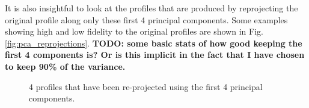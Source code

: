 \documentclass{article}
\newcommand\todo[1]{\textbf{TODO: #1}}
\begin{document}
It is also insightful to look at the profiles that are produced by reprojecting the original profile along only these first 4 principal components. Some examples showing high and low fidelity to the original profiles are shown in Fig. \ref{fig:pca_reprojections}. \todo{some basic stats of how good keeping the first 4 components is? Or is this implicit in the fact that I have chosen to keep 90\% of the variance.}

\begin{figure}[htp!]%
    \centering
    \qquad
    \qquad
    \qquad
    \qquad
    \caption{4 profiles that have been re-projected using the first 4 principal components.}%
    \label{fig:pca_components}%
\end{figure}
\end{document}
